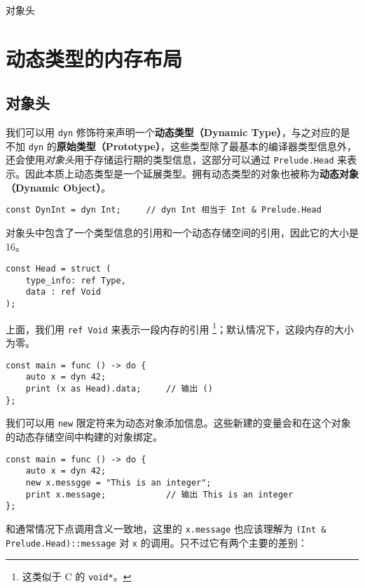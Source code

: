 \begin{introduction}
	\item 对象头
\end{introduction}

\section{动态类型的内存布局}

\subsection{对象头}

我们可以用 \lstinline!dyn! 修饰符来声明一个\textbf{动态类型（Dynamic Type）}，与之对应的是不加 \lstinline!dyn! 的\textbf{原始类型（Prototype）}，这些类型除了最基本的编译器类型信息外，还会使用\emph{对象头}用于存储运行期的类型信息，这部分可以通过 \lstinline!Prelude.Head! 来表示。因此本质上动态类型是一个延展类型。拥有动态类型的对象也被称为\textbf{动态对象（Dynamic Object）}。

\begin{lstlisting}
const DynInt = dyn Int;		// dyn Int 相当于 Int & Prelude.Head
\end{lstlisting}

对象头中包含了一个类型信息的引用和一个动态存储空间的引用，因此它的大小是 16。

\begin{lstlisting}
const Head = struct (
	type_info: ref Type,
	data : ref Void
);
\end{lstlisting}

上面，我们用 \lstinline!ref Void! 来表示一段内存的引用 \footnote{这类似于 C 的 \lstinline!void*!。}；默认情况下，这段内存的大小为零。

\begin{lstlisting}
const main = func () -> do {
	auto x = dyn 42;
	print (x as Head).data;		// 输出 ()
};
\end{lstlisting}

我们可以用 \lstinline!new! 限定符来为动态对象添加信息。这些新建的变量会和在这个对象的动态存储空间中构建的对象绑定。

\begin{lstlisting}
const main = func () -> do {
	auto x = dyn 42;
	new x.messgge = "This is an integer";
	print x.message;			// 输出 This is an integer
};
\end{lstlisting}

和通常情况下点调用含义一致地，这里的 \lstinline!x.message! 也应该理解为 \lstinline!(Int & Prelude.Head)::message! 对 \lstinline!x! 的调用。只不过它有两个主要的差别：

